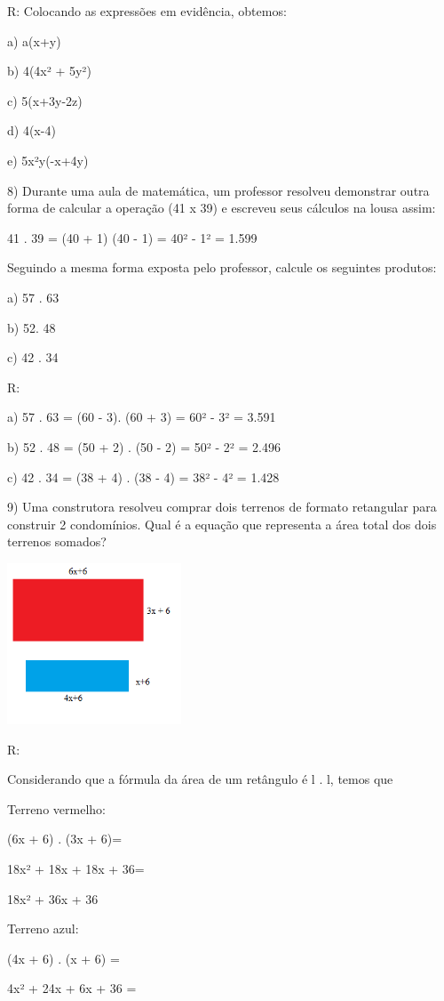 R: Colocando as expressões em evidência, obtemos:

a) a(x+y)

b) 4(4x² + 5y²)

c) 5(x+3y-2z)

d) 4(x-4)

e) 5x²y(-x+4y)

8) Durante uma aula de matemática, um professor resolveu demonstrar
outra forma de calcular a operação (41 x 39) e escreveu seus cálculos na
lousa assim:

41 . 39 = (40 + 1) (40 - 1) = 40² - 1² = 1.599

Seguindo a mesma forma exposta pelo professor, calcule os seguintes
produtos:

a) 57 . 63

b) 52. 48

c) 42 . 34

R:

a) 57 . 63 = (60 - 3). (60 + 3) = 60² - 3² = 3.591

b) 52 . 48 = (50 + 2) . (50 - 2) = 50² - 2² = 2.496

c) 42 . 34 = (38 + 4) . (38 - 4) = 38² - 4² = 1.428

9) Uma construtora resolveu comprar dois terrenos de formato retangular
para construir 2 condomínios. Qual é a equação que representa a área
total dos dois terrenos somados?

\includegraphics[width=2.04167in,height=1.8873in]{./imgSAEB_8_MAT/media/image5.png}

R:

Considerando que a fórmula da área de um retângulo é l . l, temos que

Terreno vermelho:

(6x + 6) . (3x + 6)=

18x² + 18x + 18x + 36=

18x² + 36x + 36

Terreno azul:

(4x + 6) . (x + 6) =

4x² + 24x + 6x + 36 =

